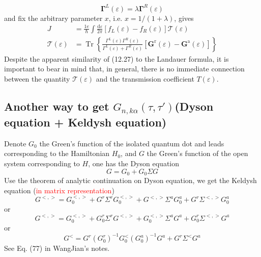 \documentclass[aps,prb,superscriptaddress]{revtex4-2}
\begin{document}
\begin{equation}
\boldsymbol{\Gamma}^{L}(\varepsilon)=\lambda \boldsymbol{\Gamma}^{R}(\varepsilon)
\end{equation}
and fix the arbitrary parameter $x$, i.e. $x=1 /(1+\lambda)$, gives
\begin{equation}
\begin{aligned}
J &=\frac{1 e}{\hbar} \int \frac{\mathrm{d} \varepsilon}{2 \pi}\left[f_{L}(\varepsilon)-f_{R}(\varepsilon)\right] \mathcal{T}(\varepsilon) \\
\mathcal{T}(\varepsilon) &=\operatorname{Tr}\left\{\frac{\Gamma^{L}(\varepsilon) \Gamma^{R}(\varepsilon)}{\Gamma^{L}(\varepsilon)+\Gamma^{R}(\varepsilon)}\left[\mathbf{G}^{\mathrm{r}}(\varepsilon)-\mathbf{G}^{\mathrm{a}}(\varepsilon)\right]\right\}
\end{aligned}
\end{equation}
Despite the apparent similarity of (12.27) to the Landauer formula, it is important to bear in mind that, in general, there is no immediate connection between the quantity $\mathcal{T}(\varepsilon)$ and the transmission coefficient $T(\varepsilon)$.
\subsection{Another way to get $G_{n,k\alpha}(\tau,\tau')$(Dyson equation + Keldysh equation)}
Denote $G_{0}$ the Green’s function of the isolated quantum dot and leads corresponding to the Hamiltonian $H_{0}$, and $G$ the Green’s function of the open system corresponding to $H$, one has the Dyson equation
\begin{equation}
G=G_{0}+G_{0} \Sigma G
\end{equation}
Use the theorem of analytic continuation on Dyson equation, we get the Keldysh equation (\textcolor{red}{in matrix representation})
\begin{equation}
G^{<,>}=G_{0}^{<,>}+G^{r} \Sigma^{r} G_{0}^{<,>}+G^{<,>} \Sigma^{a} G_{0}^{a}+G^{r} \Sigma^{<,>} G_{0}^{a}
\end{equation}
or
\begin{equation}
G^{<,>}=G_{0}^{<,>}+G_{0}^{r} \Sigma^{r} G^{<,>}+G_{0}^{<,>} \Sigma^{a} G^{a}+G_{0}^{r} \Sigma^{<,>} G^{a}
\end{equation}
or
\begin{equation}
G^{<}=G^{r}\left(G_{0}^{r}\right)^{-1} G_{0}^{<}\left(G_{0}^{a}\right)^{-1} G^{a}+G^{r} \Sigma^{<} G^{a}
\end{equation}
See Eq. (77) in WangJian's notes.
\end{document}
